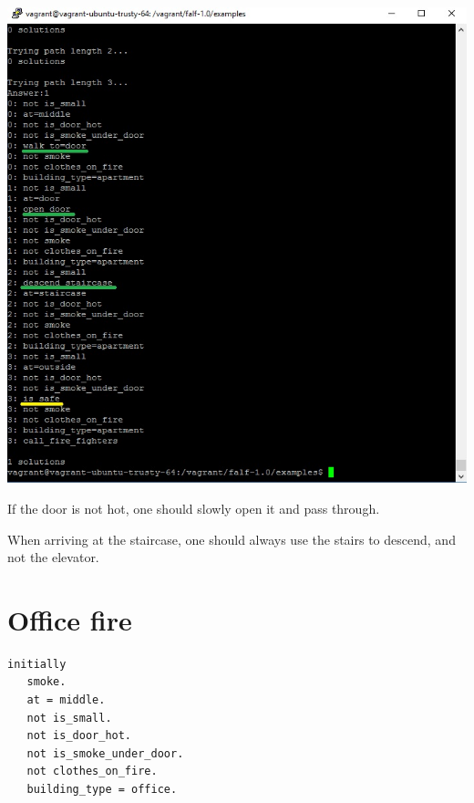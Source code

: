 \documentclass[a4paper,12pt]{report}
\begin{document}
\begin{itemize}
\includegraphics[scale=0.8]{Screenshot_ap_fire2.jpg}

If the door is not hot, one should slowly open it and pass through.

When arriving at the staircase, one should always use the stairs to descend, and not the elevator.

\end{itemize}

\section{Office fire}
\begin{verbatim}
initially
   smoke.
   at = middle.
   not is_small.
   not is_door_hot.
   not is_smoke_under_door.
   not clothes_on_fire.
   building_type = office.
\end{verbatim}
\end{document}
